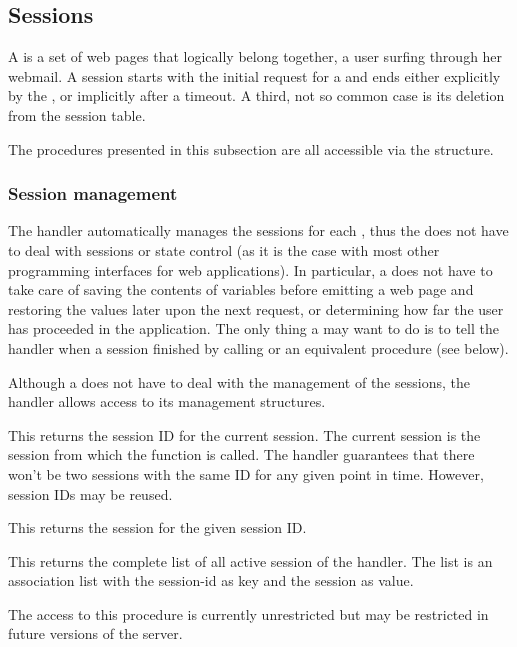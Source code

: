 \subsection{Sessions}

A  is a set of web pages that logically belong
together, \eg a user surfing through her webmail.  A session starts
with the initial request for a \surflet and ends either explicitly by
the \surflet, or implicitly after a timeout.  A third, not so common
case is its deletion from the session table.

The procedures presented in this subsection are all accessible via the
 structure.

\subsubsection{Session management}

The \surflet handler automatically manages the sessions for each
\surflet, thus the \surflet does not have to deal with sessions or
state control (as it is the case with most other programming
interfaces for web applications).  In particular, a \surflet does not
have to take care of saving the contents of variables before emitting
a web page and restoring the values later upon the next request, or
determining how far the user has proceeded in the application.  The
only thing a \surflet may want to do is to tell the \surflet handler
when a session finished by calling  or an equivalent
procedure (see below).

Although a \surflet does not have to deal with the management of the
sessions, the \surflet handler allows access to its management
structures.

\begin{desc}
  This returns the session ID for the current session.  The current
  session is the session from which the function is called.  The
  \surflet handler guarantees that there won't be two sessions with
  the same ID for any given point in time.  However, session IDs may
  be reused.
\end{desc}

\begin{desc}
  This returns the session for the given session ID.
\end{desc}

\begin{desc}
  This returns the complete list of all active session of the \surflet
  handler.  The list is an association list with the session-id as key
  and the session as value.

  The access to this procedure is currently unrestricted but may be
  restricted in future versions of the \surflet server.
\end{desc}

